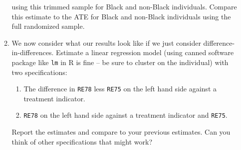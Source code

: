 \documentclass[11pt, a4paper]{article}
\begin{document}
\begin{enumerate}
\begin{enumerate}
    using this trimmed sample for Black and non-Black
    individuals. Compare this estimate to the ATE for Black and
    non-Black individuals using the full randomized sample.
    \item We now consider what our results look like if we just consider difference-in-differences. Estimate a linear regression model (using canned software package like \texttt{lm} in R is fine -- be sure to cluster on the individual) with two specifications:
    \begin{enumerate}
      \item The difference in \texttt{RE78} less \texttt{RE75} on the left hand side against a treatment indicator. 
      \item \texttt{RE78} on the left hand side against a treatment indicator and \texttt{RE75}.
    \end{enumerate}
  Report the estimates and compare to your previous estimates. Can you think of other specifications that might work? 
\end{enumerate}
\end{enumerate}
\end{document}
